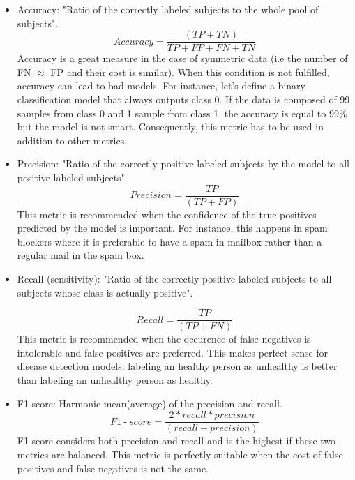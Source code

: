 \begin{itemize}
\item Accuracy: "Ratio of the correctly labeled subjects to the whole pool of subjects".
\begin{equation}
Accuracy = \frac{(TP+TN)}{TP+FP+FN+TN}
\end{equation}
Accuracy is a great measure in the case of symmetric data (i.e the number of FN $\approx$ FP and their cost is similar). When this condition is not fulfilled, accuracy can lead to bad models. For instance, let's define a binary classification model that always outputs class 0. If the data is composed of 99 samples from class 0 and 1 sample from class 1, the accuracy is equal to 99\% but the model is not smart. Consequently, this metric has to be used in addition to other metrics.

\item Precision: "Ratio of the correctly positive labeled subjects by the model to all positive labeled subjects".
\begin{equation}
Precision = \frac{TP}{(TP + FP)}
\end{equation}
This metric is recommended when the confidence of the true positives predicted by the model is important. For instance, this happens in spam blockers where it is preferable to have a spam in mailbox rather than a regular mail in the spam box.

\item Recall (sensitivity): "Ratio of the correctly positive labeled subjects to all subjects whose class is actually positive".

\begin{equation}
Recall = \frac{TP}{(TP + FN)}
\end{equation}
This metric is recommended when the occurence of false negatives is intolerable and false positives are preferred. This makes perfect sense for disease detection models: labeling an healthy person as unhealthy is better than labeling an unhealthy person as healthy.

\item F1-score: Harmonic mean(average) of the precision and recall.
\begin{equation}
F1\operatorname{-}score = \frac{2* recall * precision}{(recall + precision)}
\end{equation}
F1-score considers both precision and recall and is the highest if these two metrics are balanced. This metric is perfectly suitable when the cost of false positives and false negatives is not the same.


\end{itemize}
